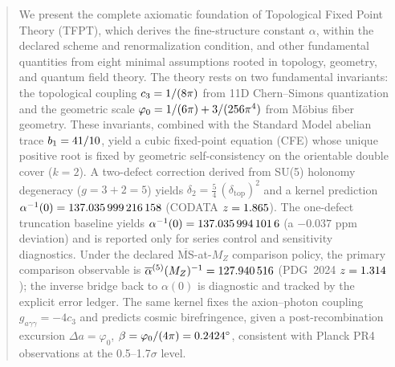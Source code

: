 
\maketitle

\begin{abstract}
We present the complete axiomatic foundation of Topological Fixed Point Theory (TFPT), 
which derives the fine-structure constant $\alpha$, within the declared scheme and renormalization condition, and other fundamental quantities 
from eight minimal assumptions rooted in topology, geometry, and quantum field theory. 
The theory rests on two fundamental invariants: the topological coupling 
$\cthree = 1/(8\pi)$ from 11D Chern--Simons quantization and the geometric scale 
$\phiz = 1/(6\pi) + 3/(256\pi^4)$ from M\"obius fiber geometry. 
These invariants, combined with the Standard Model abelian trace $\bone = 41/10$,
yield a cubic fixed-point equation (CFE) whose unique positive root is fixed by geometric self-consistency on the orientable double cover ($k=2$).
A two-defect correction derived from SU(5) holonomy degeneracy ($g=3+2=5$) yields $\delta_2=\frac54\,(\delta_{\mathrm{top}})^2$ and a kernel prediction
$\alpha^{-1}(0)=\num[round-mode=places,round-precision=12]{\TFPTalphaInvGOverFourNum}$ (CODATA $z=\num[round-mode=places,round-precision=3]{\TFPTalphaZGOverFourNum}$).
The one-defect truncation baseline yields $\alpha^{-1}(0)=\num[round-mode=places,round-precision=10]{\TFPTalphaInvSelfNum}$ (a $-0.037$ ppm deviation) and is reported only for series control and sensitivity diagnostics.
Under the declared $\overline{\mathrm{MS}}$-at-$M_Z$ comparison policy, the primary comparison observable is
$\overline{\alpha}^{(5)}(M_Z)^{-1}=\num[round-mode=places,round-precision=6]{\TFPTalphaBarFiveInvMZPredNum}$ (PDG~2024 $z=\num[round-mode=places,round-precision=3]{\TFPTalphaBarFiveInvMZZ}$);
the inverse bridge back to $\alpha(0)$ is diagnostic and tracked by the explicit error ledger.
The same kernel fixes the axion--photon coupling $g_{a\gamma\gamma}=-4c_3$ and predicts cosmic birefringence,
given a post-recombination excursion $\Delta a=\varphi_0$,
$\beta=\phiz/(4\pi)=\num[round-mode=places,round-precision=4]{\TFPTbetaDegNum}^\circ$, consistent with Planck PR4 observations at the 0.5--1.7$\sigma$ level.
\end{abstract}

